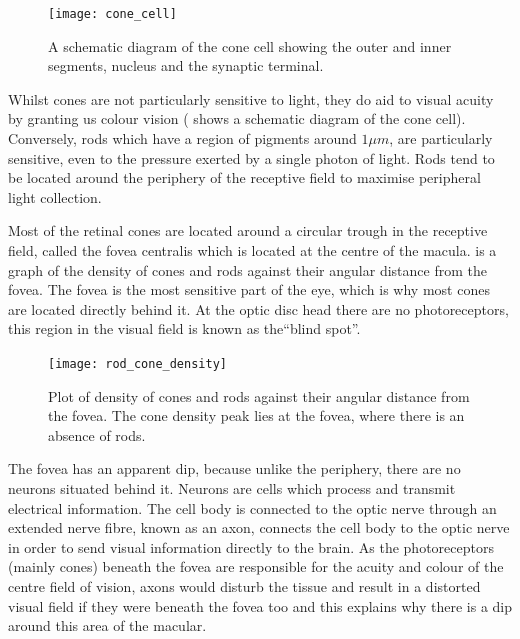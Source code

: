\begin{figure}[H]
\centering
  \texttt{[image: cone\_cell]}
\caption{A schematic diagram of the cone cell showing the outer and inner
segments, nucleus and the synaptic terminal.\cite{wikicone}}
\label{fig:cone}
\end{figure}

Whilst cones are not particularly sensitive to light, they do aid to visual
acuity by granting us colour vision ( shows a schematic
diagram of the cone cell).\cite{bowmaker1980visual} Conversely, rods
which have a region of pigments around $1\mu{m}$, are particularly
sensitive, even to the pressure exerted by a single photon of light.
Rods tend to be located around the periphery of the receptive field to
maximise peripheral light collection.
\cite{liebman1964sensitive,baylor1979responses}

Most of the retinal cones are located around a circular trough in the
receptive field, called the fovea centralis which is located at the centre
of the macula.\cite{hendrickson1994primate}
 is a graph of the density of cones and rods
against their angular distance from the fovea. The fovea is the most
sensitive part of the eye, which is why most cones are located directly
behind it. At the optic disc head there are no photoreceptors, this region
in the visual field is known as the\enquote{blind spot}.

\begin{figure}[H]
\centering
  \texttt{[image: rod\_cone\_density]}
\caption{Plot of density of cones and rods against their angular distance from
the fovea. The cone density peak lies at the fovea, where there is an absence
of rods.\cite{rod_cone_density}}
\label{fig:rod_cone_density}
\end{figure}

The fovea has an apparent dip, because unlike the periphery, there are
no neurons situated behind it. Neurons are cells which process and
transmit electrical information. The cell body is connected to the optic
nerve through an extended nerve fibre, known as an axon, connects
the cell body to the optic nerve in order to send visual information
directly to the brain. As the photoreceptors (mainly cones) beneath the
fovea are responsible for the acuity and colour of the centre field of vision,
axons would disturb the tissue and result in a distorted visual field if they
were beneath the fovea too and this explains why there is a dip around
 this area of the macular.
 

